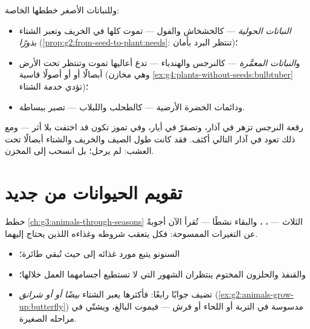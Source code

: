 \begin{proposition}\label{prop:g6:life-through-seasons:herbs}
وللنباتات الأصغر خططها الخاصة:
\begin{itemize}
  \item \emph{النباتات الحولية} --- كالخشخاش
        والفول --- تموت كلها في الخريف وتعبر الشتاء
        \emph{بذورًا} (\cref{prop:g2:from-seed-to-plant:needs}:
         تنتظر البرد بأمان)؛
  \item و\emph{النباتات المعمَّرة} ---
        كالنرجس والهندباء --- تدع أعاليها تموت وتنتظر تحت الأرض
        أبصالًا أو  أو أصولًا قاسية
        (وهي مخازن \cref{ex:g4:plants-without-seeds:bulbtuber}
        تؤدي خدمة الشتاء)؛
  \item ودائمات الخضرة الأرضية --- كالطحلب واللبلاب --- تصبر
        ببساطة.
\end{itemize}
\end{proposition}
\admitted

\begin{example}\label{ex:g6:life-through-seasons:daffodil}
رقعة النرجس تزهر في آذار، وتصفرّ في أيار، وفي تموز تكون قد اختفت
بلا أثر --- ومع ذلك تعود في آذار التالي أكثف. فقد كانت طول الصيف
والخريف والشتاء أبصالًا تحت العشب:  لم يرحل؛ بل انسحب إلى
المخزن.
\end{example}

\section{تقويم الحيوانات من جديد}

\begin{proposition}\label{prop:g6:life-through-seasons:animals}
خطط \cref{ch:g3:animals-through-seasons} الثلاث --- ،
، والبقاء نشطًا --- تُقرأ الآن أجوبةً عن التغيرات الممسوحة:
فكل  يتعقب شروطه وغذاءه اللذين يحتاج إليهما.
\begin{itemize}
  \item السنونو يتبع مورد غذائه إلى حيث تُبقي  
        طائرة؛
  \item والقنفذ والحلزون المختوم ينتظران الشهور التي لا تستطيع
        أجسامهما العمل خلالها؛
  \item {} تضيف جوابًا رابعًا: فأكثرها يعبر الشتاء
        \emph{بيضًا أو  أو شرانق}
        (\cref{ex:g2:animals-grow-up:butterfly}) مدسوسة في
        التربة أو اللحاء أو فرش  --- فيموت البالغ، ويشتّي
         في مراحله الصغيرة.
\end{itemize}
\end{proposition}
\admitted

